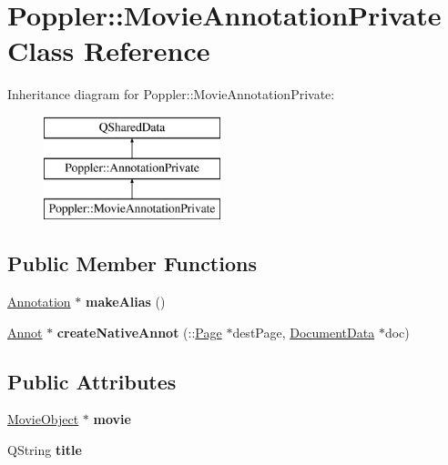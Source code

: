 \hypertarget{class_poppler_1_1_movie_annotation_private}{}\section{Poppler\+:\+:Movie\+Annotation\+Private Class Reference}
\label{class_poppler_1_1_movie_annotation_private}
Inheritance diagram for Poppler\+:\+:Movie\+Annotation\+Private\+:\begin{figure}[H]
\begin{center}
\leavevmode
\includegraphics[height=3.000000cm]{class_poppler_1_1_movie_annotation_private}
\end{center}
\end{figure}
\subsection*{Public Member Functions}
\begin{DoxyCompactItemize}
\item 
\mbox{\label{class_poppler_1_1_movie_annotation_private_ac57b9e44a450f2fca27e64a12ba863c8}} 
\hyperlink{class_poppler_1_1_annotation}{Annotation} $\ast$ {\bfseries make\+Alias} ()
\item 
\mbox{\label{class_poppler_1_1_movie_annotation_private_ac1285d843804630a5138327c0ff7c38c}} 
\hyperlink{class_annot}{Annot} $\ast$ {\bfseries create\+Native\+Annot} (\+::\hyperlink{class_poppler_1_1_page}{Page} $\ast$dest\+Page, \hyperlink{class_poppler_1_1_document_data}{Document\+Data} $\ast$doc)
\end{DoxyCompactItemize}
\subsection*{Public Attributes}
\begin{DoxyCompactItemize}
\item 
\mbox{\label{class_poppler_1_1_movie_annotation_private_a2baa6cd2e63ee0d953677eb51171bdc6}} 
\hyperlink{class_poppler_1_1_movie_object}{Movie\+Object} $\ast$ {\bfseries movie}
\item 
\mbox{\label{class_poppler_1_1_movie_annotation_private_aa0d4978585b9a9d9b66c6f277b4b3034}} 
Q\+String {\bfseries title}
\end{DoxyCompactItemize}
